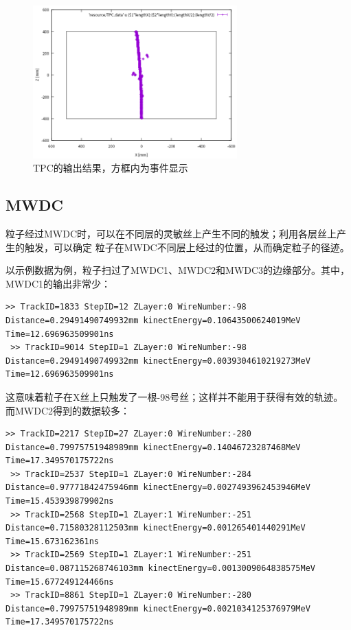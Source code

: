 \documentclass[bachelor,openany,oneside,color]{buaathesis}
\begin{document}
\begin{figure}
	\centering
	\includegraphics[width=0.7\textwidth]{./resource/TPC-result.png}
	\caption{TPC的输出结果，方框内为事件显示}\label{fig:result:TPC}
\end{figure}

\subsection{MWDC}

粒子经过MWDC时，可以在不同层的灵敏丝上产生不同的触发；利用各层丝上产生的触发，可以确定
粒子在MWDC不同层上经过的位置，从而确定粒子的径迹。

以示例数据为例，粒子扫过了MWDC1、MWDC2和MWDC3的边缘部分。其中，MWDC1的输出非常少：

\begin{lstlisting}[firstnumber=3709,lastline=3710]
 >> TrackID=1833 StepID=12 ZLayer:0 WireNumber:-98 Distance=0.29491490749932mm kinectEnergy=0.10643500624019MeV Time=12.696963509901ns
 >> TrackID=9014 StepID=1 ZLayer:0 WireNumber:-98 Distance=0.29491490749932mm kinectEnergy=0.0039304610219273MeV Time=12.696963509901ns
\end{lstlisting}

这意味着粒子在X丝上只触发了一根-98号丝；这样并不能用于获得有效的轨迹。
而MWDC2得到的数据较多：

\begin{lstlisting}[firstnumber=3760,lastline=3768]
 >> TrackID=2217 StepID=27 ZLayer:0 WireNumber:-280 Distance=0.79975751948989mm kinectEnergy=0.14046723287468MeV Time=17.349570175722ns
 >> TrackID=2537 StepID=1 ZLayer:0 WireNumber:-284 Distance=0.97771842475946mm kinectEnergy=0.0027493962453946MeV Time=15.453939879902ns
 >> TrackID=2568 StepID=1 ZLayer:1 WireNumber:-251 Distance=0.71580328112503mm kinectEnergy=0.001265401440291MeV Time=15.673162361ns
 >> TrackID=2569 StepID=1 ZLayer:1 WireNumber:-251 Distance=0.087115268746103mm kinectEnergy=0.0013009064838575MeV Time=15.677249124466ns
 >> TrackID=8861 StepID=1 ZLayer:0 WireNumber:-280 Distance=0.79975751948989mm kinectEnergy=0.0021034125376979MeV Time=17.349570175722ns
\end{lstlisting}
\end{document}
